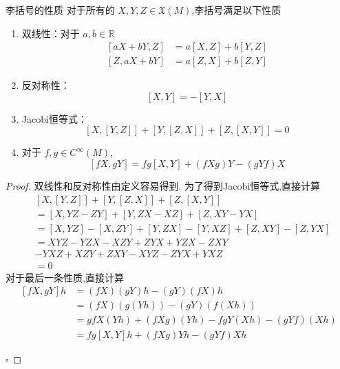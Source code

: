 \documentclass[../../几何与拓扑.tex]{subfiles}
\begin{document}
\begin{proposition}{李括号的性质}
    对于所有的 \(  X,Y,Z \in \mathfrak{X}\left( M \right)   \),李括号满足以下性质
    \begin{enumerate}
        \item 双线性：对于 \(  a,b \in \mathbb{R}   \) \[
        \begin{aligned}
        \left[ aX+ bY,Z \right]&= a[X,Z]+ b[Y,Z]  \\ 
          [Z,aX+ bY]& = a[Z,X]+ b[Z,Y]
        \end{aligned}
        \] 
        \item 反对称性：  \[
        [X,Y]  =  -\left[ Y,X \right] 
        \]
        \item  Jacobi恒等式：  \[
        \left[ X,\left[ Y,Z \right]  \right]+  \left[ Y,\left[ Z,X \right]  \right]+  \left[ Z,\left[ X,Y \right]  \right] =  0   
        \] 
        \item 对于 \(  f,g \in C^{\infty}\left( M \right)   \),\[
        \left[ fX,gY \right] =  fg[X,Y]+ \left( fXg \right)Y-\left( gYf \right)X   
        \] 
    \end{enumerate}
     
\end{proposition}
\begin{proof}
    双线性和反对称性由定义容易得到.
    为了得到Jacobi恒等式,直接计算 \[
    \begin{aligned}
    & \left[ X,\left[ Y,Z \right]  \right]+  \left[ Y,\left[ Z,X \right]  \right]   +  \left[ Z,\left[ X,Y \right]  \right]\\ 
     & =  [X,YZ-ZY]+  [Y,ZX-XZ]+ [Z,XY-YX]\\ 
      & =  [X,YZ]-[X,ZY]+ [Y,ZX]-[Y,XZ]+  [Z,XY]-[Z,YX]\\ 
       & =  XYZ-YZX-XZY+ ZYX + YZX-ZXY \\ 
      &  -YXZ+ XZY+ ZXY-XYZ-ZYX+ YXZ\\ 
        & =  0
    \end{aligned}
    \]
    对于最后一条性质,直接计算 \[
    \begin{aligned}
    \left[ fX,gY \right]h& = \left( fX \right)\left( gY \right)h-\left( gY \right)\left( fX \right)h\\ 
     & =  \left( fX \right) \left( g\left( Yh \right)  \right) -\left( gY \right)\left( f\left( Xh \right)  \right)\\ 
      & =  gf X\left( Yh \right) +  \left( fXg \right)\left( Yh \right) - fgY \left( Xh \right) - \left( gYf \right) \left( Xh \right)  \\ 
       & = fg[X,Y]h + \left( fXg \right)Yh- \left( gYf \right)Xh                  
    \end{aligned}
    \]

    \hfill $\square$
\end{proof}
\end{document}
